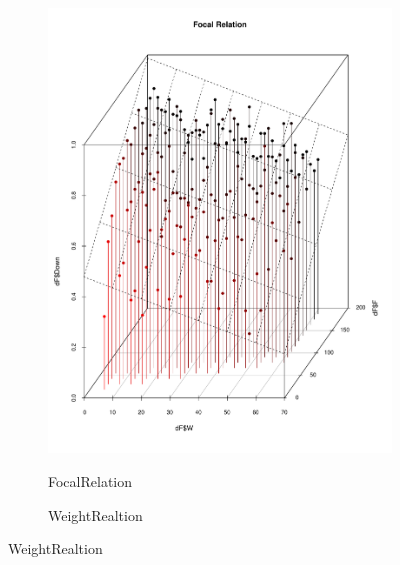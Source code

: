 \documentclass{itatnew}
\begin{document}
\begin{figure}[htp]
  \begin{subfigure}{\linewidth}
    \caption{FocalRelation}
    \includegraphics[width=\linewidth]{images/FocalRealationDown}
    \label{fig:FocalRelation}
  \end{subfigure}
  \hspace{1em}
  \begin{subfigure}{\linewidth}
    \caption{WeightRealtion}

\end{subfigure}
\end{figure}
\end{document}
